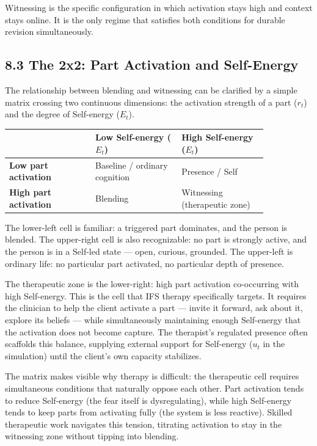 \documentclass[11pt]{article}
\begin{document}
Witnessing is the specific configuration in which activation stays high
and context stays online. It is the only regime that satisfies both
conditions for durable revision simultaneously.

\subsection{8.3 The 2x2: Part Activation and
Self-Energy}\label{the-2x2-part-activation-and-self-energy}

The relationship between blending and witnessing can be clarified by a
simple matrix crossing two continuous dimensions: the activation
strength of a part (\(r_t\)) and the degree of Self-energy (\(E_t\)).

\begin{table}[htbp]
\centering
\small
\begin{tabular}{|p{0.28\linewidth}|p{0.28\linewidth}|p{0.28\linewidth}|}
\hline
 & \textbf{Low Self-energy ($E_t$)} & \textbf{High Self-energy ($E_t$)} \\
\hline
\textbf{Low part activation} & Baseline / ordinary cognition & Presence / Self \\
\hline
\textbf{High part activation} & Blending & Witnessing (therapeutic zone) \\
\hline
\end{tabular}
\end{table}

The lower-left cell is familiar: a triggered part dominates, and the
person is blended. The upper-right cell is also recognizable: no part is
strongly active, and the person is in a Self-led state --- open,
curious, grounded. The upper-left is ordinary life: no particular part
activated, no particular depth of presence.

The therapeutic zone is the lower-right: high part activation
co-occurring with high Self-energy. This is the cell that IFS therapy
specifically targets. It requires the clinician to help the client
activate a part --- invite it forward, ask about it, explore its beliefs
--- while simultaneously maintaining enough Self-energy that the
activation does not become capture. The therapist's regulated presence
often scaffolds this balance, supplying external support for Self-energy
(\(u_t\) in the simulation) until the client's own capacity stabilizes.

The matrix makes visible why therapy is difficult: the therapeutic cell
requires simultaneous conditions that naturally oppose each other. Part
activation tends to reduce Self-energy (the fear itself is
dysregulating), while high Self-energy tends to keep parts from
activating fully (the system is less reactive). Skilled therapeutic work
navigates this tension, titrating activation to stay in the witnessing
zone without tipping into blending.
\end{document}
